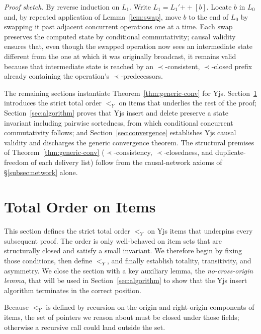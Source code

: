 \documentclass[sigplan,screen]{acmart}
\newcommand{\YjsLt}{\mathrel{<_Y}}
\newcommand{\hb}{\mathrel{\prec}}
\begin{document}
\noindent\textit{Proof sketch.}
By reverse induction on $L_1$.  Write $L_1 = L_1' \mathbin{+\!\!+} [b]$.
Locate $b$ in $L_0$ and, by repeated application of
Lemma~\ref{lem:swap}, move $b$ to the end of $L_0$ by swapping it past
adjacent concurrent operations one at a time.  Each swap preserves the
computed state by conditional commutativity; causal validity ensures
that, even though the swapped operation now sees an intermediate state
different from the one at which it was originally broadcast, it
remains valid because that intermediate state is reached by an
$\hb$-consistent, $\hb$-closed prefix already containing the
operation's $\hb$-predecessors.

\smallskip
\noindent
The remaining sections instantiate Theorem~\ref{thm:generic-conv} for
Yjs.  Section~\ref{sec:order} introduces the strict total order
$\YjsLt$ on items that underlies the rest of the proof;
Section~\ref{sec:algorithm} proves that Yjs insert and delete preserve
a state invariant including pairwise sortedness, from which conditional
concurrent commutativity follows; and Section~\ref{sec:convergence}
establishes Yjs causal validity and discharges the generic convergence
theorem.  The structural premises of
Theorem~\ref{thm:generic-conv} ($\hb$-consistency, $\hb$-closedness,
and duplicate-freedom of each delivery list) follow from the
causal-network axioms of \S\ref{subsec:network} alone.

\section{Total Order on Items}
\label{sec:order}

This section defines the strict total order $\YjsLt$ on Yjs items that
underpins every subsequent proof.  The order is only well-behaved on item
sets that are structurally closed and satisfy a small invariant.  We
therefore begin by fixing those conditions, then define $\YjsLt$, and
finally establish totality, transitivity, and asymmetry.  We close the
section with a key auxiliary lemma, the \emph{no-cross-origin lemma}, that
will be used in Section~\ref{sec:algorithm} to show that the Yjs insert
algorithm terminates in the correct position.

Because $\YjsLt$ is defined by recursion on the origin and right-origin
components of items, the set of pointers we reason about must be closed under
those fields; otherwise a recursive call could land outside the set.
\end{document}
